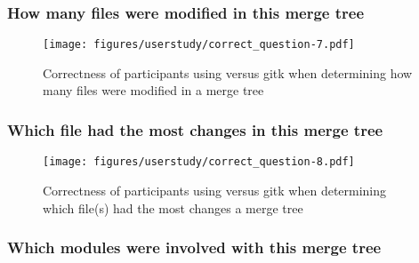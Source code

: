 \subsubsection{How many files were modified in this merge tree}
\label{ssub:how_many_files_were_modified_in_this_merge_tree}





\begin{figure}[htpb]
  \centering
  \texttt{[image: figures/userstudy/correct\_question-7.pdf]}
  \caption{Correctness of participants using \tool versus gitk when
    determining how many files were modified in a merge tree}
  \label{fig:figures/userstudy/correct_question-7}
\end{figure}

\subsubsection{Which file had the most changes in this merge tree}
\label{ssub:which_file_had_the_most_changes_in_this_merge_tree}





\begin{figure}[htpb]
  \centering
  \texttt{[image: figures/userstudy/correct\_question-8.pdf]}
  \caption{Correctness of participants using \tool versus gitk when
    determining which file(s) had the most changes a merge tree}
  \label{fig:figures/userstudy/correct_question-8}
\end{figure}

\subsubsection{Which modules were involved with this merge tree}
\label{ssub:which_modules_were_involved_with_this_merge_tree}



